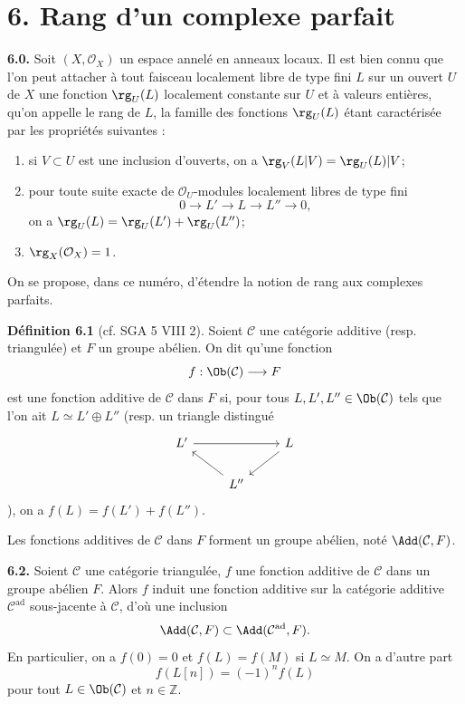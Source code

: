 \documentclass[11pt]{article}
\begin{document}
\section*{6. Rang d'un complexe parfait}

\textbf{6.0.} Soit \((X,\mathcal O_X)\) un espace annelé en anneaux locaux. Il est bien connu que l'on peut attacher à tout faisceau localement libre de type fini \(L\) sur un ouvert \(U\) de \(X\) une fonction \(\rg_U(L)\) localement constante sur \(U\) et à valeurs entières, qu'on appelle le rang de \(L\), la famille des fonctions \(\rg_U(L)\) étant caractérisée par les propriétés suivantes :
\begin{enumerate}[label=(\roman*)]
\item si \(V\subset U\) est une inclusion d'ouverts, on a \(\rg_V(L|V)=\rg_U(L)|V\);
\item pour toute suite exacte de \(\mathcal O_U\)-modules localement libres de type fini
\[
  0\longrightarrow L'\longrightarrow L\longrightarrow L''\longrightarrow 0,
\]
on a \(\rg_U(L)=\rg_U(L')+\rg_U(L'')\);
\item \(\rg_X(\mathcal O_X)=1\).
\end{enumerate}
On se propose, dans ce numéro, d'étendre la notion de rang aux complexes parfaits.

\textbf{Définition 6.1} (cf. SGA 5 VIII 2). Soient \(\mathcal C\) une catégorie additive (resp. triangulée) et \(F\) un groupe abélien. On dit qu'une fonction
\[
  f:\Ob(\mathcal C)\longrightarrow F
\]
est une fonction additive de \(\mathcal C\) dans \(F\) si, pour tous \(L,L',L''\in\Ob(\mathcal C)\) tels que l'on ait \(L\simeq L'\oplus L''\) (resp. un triangle distingué
\[
\begin{tikzcd}
L' \arrow[rr] && L \arrow[dl]\\
& L'' \arrow[ul] &
\end{tikzcd}
\]
), on a \(f(L)=f(L')+f(L'')\).

Les fonctions additives de \(\mathcal C\) dans \(F\) forment un groupe abélien, noté \(\Add(\mathcal C,F)\).

\textbf{6.2.} Soient \(\mathcal C\) une catégorie triangulée, \(f\) une fonction additive de \(\mathcal C\) dans un groupe abélien \(F\). Alors \(f\) induit une fonction additive sur la catégorie additive \(\mathcal C^{\mathrm{ad}}\) sous-jacente à \(\mathcal C\), d'où une inclusion
\[
  \Add(\mathcal C,F)\subset \Add(\mathcal C^{\mathrm{ad}},F).
\]
En particulier, on a \(f(0)=0\) et \(f(L)=f(M)\) si \(L\simeq M\). On a d'autre part
\[
  f(L[n])=(-1)^n f(L)
\]
pour tout \(L\in\Ob(\mathcal C)\) et \(n\in\mathbb Z\).
\end{document}
